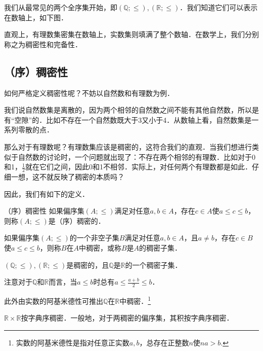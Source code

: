 
\begin{issues}
\issueDraft
\issueTODO
\end{issues}

我们从最常见的两个全序集开始，即$(\mathbb{Q};\leq),(\mathbb{R};\leq)$．我们知道它们可以表示在数轴上，如下图．


直观上，有理数集密集在数轴上，实数集则填满了整个数轴．在数学上，我们分别称之为稠密性和完备性．

\subsection{（序）稠密性}

如何严格定义稠密性呢？不妨以自然数和有理数为例．

我们说自然数集是离散的，因为两个相邻的自然数之间不能有其他自然数，所以是有“空隙”的．比如不存在一个自然数既大于3又小于4．从数轴上看，自然数集是一系列零散的点．

那么对于有理数呢？有理数集应该是稠密的，这符合我们的直观．当我们想进行类似于自然数的讨论时，一个问题就出现了：不存在两个相邻的有理数．比如对于0和1，$\frac{1}{2}$就在它们之间，因此0和1不相邻．实际上，对任何两个有理数都是如此．仔细一想，这不就反映了稠密的本质吗？

因此，我们有如下的定义．

\begin{definition}{（序）稠密性}
如果偏序集$(A;\leq)$满足对任意$a,b\in A$，存在$c\in A$使$a\leq c\leq b$，则称$(A;\leq)$是（序）稠密的．

如果偏序集$(A;\leq)$的一个非空子集$B$满足对任意$a,b\in A$，且$a\neq b$，存在$c\in B$使$a\leq c\leq b$，则称$B$在$A$中稠密，或称$B$是$A$的稠密子集．
\end{definition}

\begin{example}{}
$(\mathbb{Q};\leq),(\mathbb{R};\leq)$是稠密的，且$\mathbb{Q}$是$\mathbb{R}$的一个稠密子集．
\end{example}

注意对于$\mathbb{Q}$和$\mathbb{R}$而言，当$a\leq b$时总有$a\leq\frac{a+b}{2}\leq b$．

此外由实数的阿基米德性可推出$\mathbb{Q}$在$\mathbb{R}$中稠密．\footnote{实数的阿基米德性是指对任意正实数$a,b$，总存在正整数$n$使$na>b$.}

\begin{example}{}
$\mathbb{R}\times\mathbb{R}$按字典序稠密．一般地，对于两稠密的偏序集，其积按字典序稠密．
\end{example}

